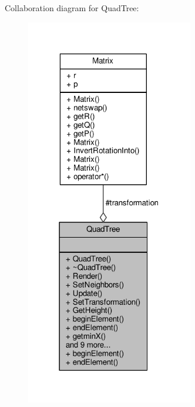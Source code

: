 Collaboration diagram for Quad\+Tree\+:
\nopagebreak
\begin{figure}[H]
\begin{center}
\leavevmode
\includegraphics[width=207pt]{d8/db1/classQuadTree__coll__graph}
\end{center}
\end{figure}

